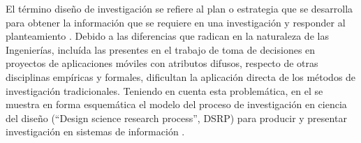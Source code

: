 
El término diseño de investigación se refiere al plan o estrategia que se desarrolla para obtener la información que se requiere en una investigación y responder al planteamiento \cite[p. 128]{hernandez2010metodologia}. Debido a las diferencias que radican en la naturaleza de las Ingenierías, incluída  las presentes en el  trabajo de toma de decisiones en proyectos de aplicaciones móviles con atributos difusos, respecto de otras disciplinas empíricas y formales, dificultan la aplicación directa de los métodos de investigación tradicionales. Teniendo en cuenta esta problemática, en el  se muestra en forma esquemática el modelo del proceso de investigación en ciencia del diseño (``Design science research process'', DSRP) para producir y presentar investigación en sistemas de información \cite[p. 93]{peffers2006design}.\\
	

